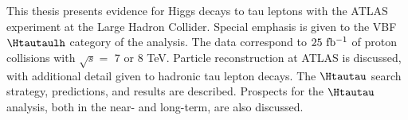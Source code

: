 
This thesis presents evidence for Higgs decays to tau leptons with the ATLAS experiment at the Large Hadron Collider. Special emphasis is given to the VBF $\Htautaulh$ category of the analysis. The data correspond to $25\ \ifb$ of proton collisions with $\sqrt{s} = $ 7 or 8 TeV. Particle reconstruction at ATLAS is discussed, with additional detail given to hadronic tau lepton decays. The $\Htautau$ search strategy, predictions, and results are described. Prospects for the $\Htautau$ analysis, both in the near- and long-term, are also discussed.


